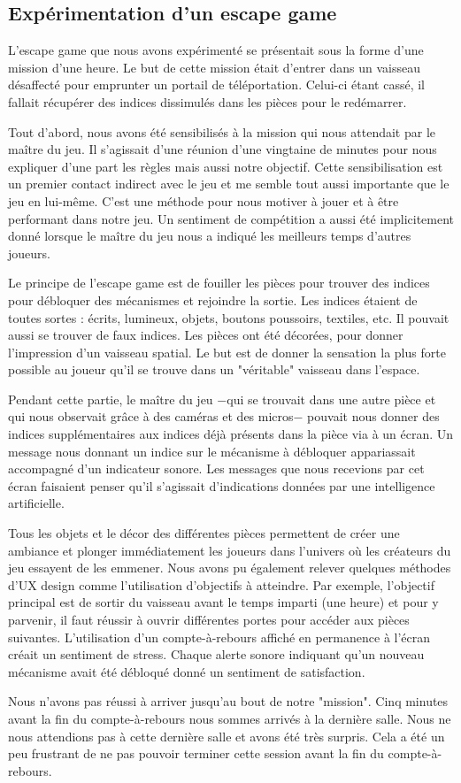\documentclass[11pt]{article}
\begin{document}
	\subsection{Expérimentation d'un escape game}\label{sec:expescape}
		L'escape game que nous avons expérimenté se présentait sous la forme d'une mission d'une heure.
		Le but de cette mission était d'entrer dans un vaisseau désaffecté pour emprunter un portail de téléportation.
		Celui-ci étant cassé, il fallait récupérer des indices dissimulés dans les pièces pour le redémarrer.\par
		Tout d'abord, nous avons été sensibilisés à la mission qui nous attendait par le maître du jeu.
		Il s'agissait d'une réunion d'une vingtaine de minutes pour nous expliquer d'une part les règles mais aussi notre objectif.
		Cette sensibilisation est un premier contact indirect avec le jeu et me semble tout aussi importante que le jeu en lui-même.
		C'est une méthode pour nous motiver à jouer et à être performant dans notre jeu.
		Un sentiment de compétition a aussi été implicitement donné lorsque le maître du jeu nous a indiqué les meilleurs temps d'autres joueurs.\par
		Le principe de l'escape game est de fouiller les pièces pour trouver des indices pour débloquer des mécanismes et rejoindre la sortie.
		Les indices étaient de toutes sortes : écrits, lumineux, objets, boutons poussoirs, textiles, etc.
		Il pouvait aussi se trouver de faux indices.
		Les pièces ont été décorées, pour donner l'impression d'un vaisseau spatial.
		Le but est de donner la sensation la plus forte possible au joueur qu'il se trouve dans un "véritable" vaisseau dans l'espace.\par
		Pendant cette partie, le maître du jeu $-$qui se trouvait dans une autre pièce et qui nous observait grâce à des caméras et des micros$-$ pouvait nous donner des indices supplémentaires aux indices déjà présents dans la pièce via à un écran.
		Un message nous donnant un indice sur le mécanisme à débloquer appariassait accompagné d'un indicateur sonore.
		Les messages que nous recevions par cet écran faisaient penser qu'il s'agissait d'indications données par une intelligence artificielle.\par
		Tous les objets et le décor des différentes pièces permettent de créer une ambiance et plonger immédiatement les joueurs dans l'univers où les créateurs du jeu essayent de les emmener.
		Nous avons pu également relever quelques méthodes d'UX design comme l'utilisation d'objectifs à atteindre.
		Par exemple, l'objectif principal est de sortir du vaisseau avant le temps imparti (une heure) et pour y parvenir, il faut réussir à ouvrir différentes portes pour accéder aux pièces suivantes.
		L'utilisation d'un compte-à-rebours affiché en permanence à l'écran créait un sentiment de stress.
		Chaque alerte sonore indiquant qu'un nouveau mécanisme avait été débloqué donné un sentiment de satisfaction.\par
		Nous n'avons pas réussi à arriver jusqu'au bout de notre "mission". Cinq minutes avant la fin du compte-à-rebours nous sommes arrivés à la dernière salle.
		Nous ne nous attendions pas à cette dernière salle et avons été très surpris.
		Cela a été un peu frustrant de ne pas pouvoir terminer cette session avant la fin du compte-à-rebours.
\end{document}
